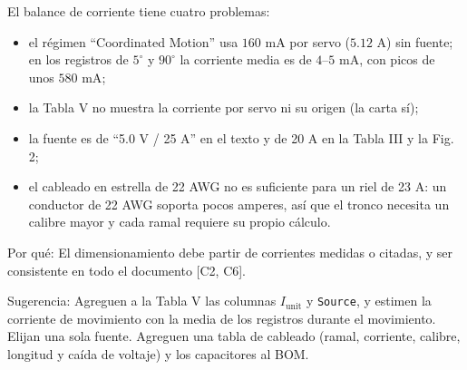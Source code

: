 \documentclass{LabDSTresponse}
\begin{document}
{El balance de corriente tiene cuatro problemas:
\begin{itemize}
    \item el régimen “Coordinated Motion” usa $160\text{ mA}$ por servo ($5.12\text{ A}$) sin fuente; en los registros de $5^\circ$ y $90^\circ$ la corriente media es de $4\text{--}5\text{ mA}$, con picos de unos $580\text{ mA}$;
    \item la Tabla V no muestra la corriente por servo ni su origen (la carta sí);
    \item la fuente es de “5.0 V / 25 A” en el texto y de 20 A en la Tabla III y la Fig. 2;
    \item el cableado en estrella de 22 AWG no es suficiente para un riel de 23 A: un conductor de 22 AWG soporta pocos amperes, así que el tronco necesita un calibre mayor y cada ramal requiere su propio cálculo.
\end{itemize}
Por qué: El dimensionamiento debe partir de corrientes medidas o citadas, y ser consistente en todo el documento [C2, C6].

Sugerencia: Agreguen a la Tabla V las columnas $I_{\text{unit}}$ y \texttt{Source}, y estimen la corriente de movimiento con la media de los registros durante el movimiento. Elijan una sola fuente. Agreguen una tabla de cableado (ramal, corriente, calibre, longitud y caída de voltaje) y los capacitores al BOM.}
\end{document}
